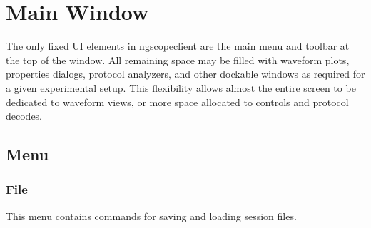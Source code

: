 \chapter{Main Window}

The only fixed UI elements in ngscopeclient are the main menu and toolbar at the top of the window. All remaining space
may be filled with waveform plots, properties dialogs, protocol analyzers, and other dockable windows as required for a
given experimental setup. This flexibility allows almost the entire screen to be dedicated to waveform views, or more
space allocated to controls and protocol decodes.

\section{Menu}

\subsection{File}

This menu contains commands for saving and loading session files.

